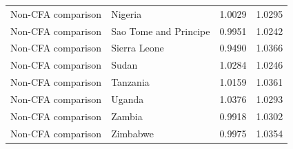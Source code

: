 \begin{table}
\begin{tabular}[t]{llrr}
Non-CFA comparison & Nigeria & 1.0029 & 1.0295\\
Non-CFA comparison & Sao Tome and Principe & 0.9951 & 1.0242\\
Non-CFA comparison & Sierra Leone & 0.9490 & 1.0366\\
\addlinespace
Non-CFA comparison & Sudan & 1.0284 & 1.0246\\
Non-CFA comparison & Tanzania & 1.0159 & 1.0361\\
Non-CFA comparison & Uganda & 1.0376 & 1.0293\\
Non-CFA comparison & Zambia & 0.9918 & 1.0302\\
Non-CFA comparison & Zimbabwe & 0.9975 & 1.0354\\
\bottomrule
\end{tabular}
\end{table}